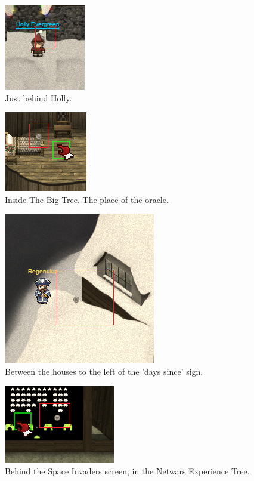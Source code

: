 \documentclass[writeup.tex]{subfiles}
\begin{document}
			\begin{figure}[H]
				\centering
				\includegraphics[scale=1]{"screenshots/coins/Netcoin 1978 - Behind Holly"}
				\caption{Just behind Holly.}
			\end{figure}
			
			\begin{figure}[H]
				\centering
				\includegraphics[scale=1]{"screenshots/coins/Netcoin 1978 - The Big Tree"}
				\caption{Inside The Big Tree. The place of the oracle.}
			\end{figure}
			
			\begin{figure}[H]
				\centering
				\includegraphics[scale=1]{"screenshots/coins/Netcoin 1789 - Outside left of days since"}
				\caption{Between the houses to the left of the 'days since' sign.}
			\end{figure}
			
			\begin{figure}[H]
				\centering
				\includegraphics[scale=1]{"screenshots/coins/Netcoin 1978 - Netwars Experience Treehouse"}
				\caption{Behind the Space Invaders screen, in the Netwars Experience Tree.}
			\end{figure}
			
\end{document}
